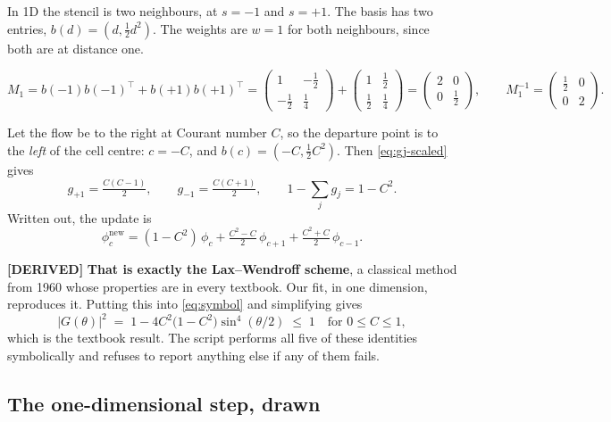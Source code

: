 \documentclass[11pt,a4paper]{article}
\newcommand{\derived}{\textcolor{blue!50!black}{\textbf{[DERIVED]}}}
\begin{document}
In 1D the stencil is two neighbours, at $s = -1$ and $s = +1$. The basis has two entries,
$b(d) = (d, \tfrac12 d^2)$. The weights are $w = 1$ for both neighbours, since both are at
distance one.

\[
M_1 = b(-1)b(-1)^{\!\top} + b(+1)b(+1)^{\!\top}
= \begin{pmatrix} 1 & -\tfrac12 \\ -\tfrac12 & \tfrac14\end{pmatrix}
+ \begin{pmatrix} 1 & \tfrac12 \\ \tfrac12 & \tfrac14\end{pmatrix}
= \begin{pmatrix} 2 & 0 \\ 0 & \tfrac12 \end{pmatrix},
\qquad
M_1^{-1} = \begin{pmatrix} \tfrac12 & 0 \\ 0 & 2 \end{pmatrix}.
\]

Let the flow be to the right at Courant number $C$, so the departure point is to the
\emph{left} of the cell centre: $c = -C$, and $b(c) = (-C, \tfrac12 C^2)$. Then
\eqref{eq:gj-scaled} gives
\[
  g_{+1} = \tfrac{C(C-1)}{2}, \qquad
  g_{-1} = \tfrac{C(C+1)}{2}, \qquad
  1 - \textstyle\sum_j g_j = 1 - C^2 .
\]
Written out, the update is
\begin{equation}
  \phi_c^{\text{new}}
  = (1 - C^2)\,\phi_c + \tfrac{C^2 - C}{2}\,\phi_{c+1} + \tfrac{C^2 + C}{2}\,\phi_{c-1}.
\end{equation}

\derived{} \textbf{That is exactly the Lax--Wendroff scheme}, a classical method from 1960
whose properties are in every textbook. Our fit, in one dimension, reproduces it. Putting
this into \eqref{eq:symbol} and simplifying gives
\begin{equation}
  |G(\theta)|^2 \;=\; 1 - 4C^2\bigl(1-C^2\bigr)\sin^4(\theta/2)
  \;\le\; 1 \quad\text{for } 0 \le C \le 1,
  \label{eq:lw}
\end{equation}
which is the textbook result. The script performs all five of these identities symbolically
and refuses to report anything else if any of them fails.

\subsection{The one-dimensional step, drawn}
\label{sec:1dfig}
\end{document}
